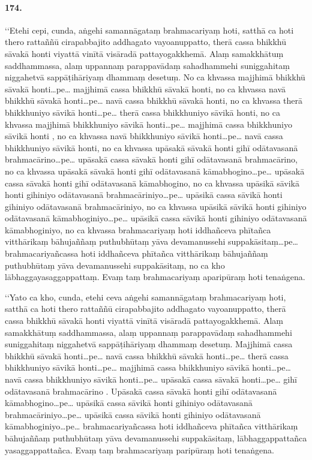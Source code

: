 \paragraph{174.} ‘‘Etehi cepi, cunda, aṅgehi samannāgataṃ brahmacariyaṃ hoti, satthā ca hoti thero rattaññū cirapabbajito addhagato vayoanuppatto, therā cassa bhikkhū sāvakā honti viyattā vinītā visāradā pattayogakkhemā. Alaṃ samakkhātuṃ saddhammassa, alaṃ uppannaṃ parappavādaṃ sahadhammehi suniggahitaṃ niggahetvā sappāṭihāriyaṃ dhammaṃ desetuṃ. No ca khvassa majjhimā bhikkhū sāvakā honti…pe… majjhimā cassa bhikkhū sāvakā honti, no ca khvassa navā bhikkhū sāvakā honti…pe… navā cassa bhikkhū sāvakā honti, no ca khvassa therā bhikkhuniyo sāvikā honti…pe… therā cassa bhikkhuniyo sāvikā honti, no ca khvassa majjhimā bhikkhuniyo sāvikā honti…pe… majjhimā cassa bhikkhuniyo sāvikā honti , no ca khvassa navā bhikkhuniyo sāvikā honti…pe… navā cassa bhikkhuniyo sāvikā honti, no ca khvassa upāsakā sāvakā honti gihī odātavasanā brahmacārino…pe… upāsakā cassa sāvakā honti gihī odātavasanā brahmacārino, no ca khvassa upāsakā sāvakā honti gihī odātavasanā kāmabhogino…pe… upāsakā cassa sāvakā honti gihī odātavasanā kāmabhogino, no ca khvassa upāsikā sāvikā honti gihiniyo odātavasanā brahmacāriniyo…pe… upāsikā cassa sāvikā honti gihiniyo odātavasanā brahmacāriniyo, no ca khvassa upāsikā sāvikā honti gihiniyo odātavasanā kāmabhoginiyo…pe… upāsikā cassa sāvikā honti gihiniyo odātavasanā kāmabhoginiyo, no ca khvassa brahmacariyaṃ hoti iddhañceva phītañca vitthārikaṃ bāhujaññaṃ puthubhūtaṃ yāva devamanussehi suppakāsitaṃ…pe… brahmacariyañcassa hoti iddhañceva phītañca vitthārikaṃ bāhujaññaṃ puthubhūtaṃ yāva devamanussehi suppakāsitaṃ, no ca kho lābhaggayasaggappattaṃ. Evaṃ taṃ brahmacariyaṃ aparipūraṃ hoti tenaṅgena.

‘‘Yato ca kho, cunda, etehi ceva aṅgehi samannāgataṃ brahmacariyaṃ hoti, satthā ca hoti thero rattaññū cirapabbajito addhagato vayoanuppatto, therā cassa bhikkhū sāvakā honti viyattā vinītā visāradā pattayogakkhemā. Alaṃ samakkhātuṃ saddhammassa, alaṃ uppannaṃ parappavādaṃ sahadhammehi suniggahitaṃ niggahetvā sappāṭihāriyaṃ dhammaṃ desetuṃ. Majjhimā cassa bhikkhū sāvakā honti…pe… navā cassa bhikkhū sāvakā honti…pe… therā cassa bhikkhuniyo sāvikā honti…pe… majjhimā cassa bhikkhuniyo sāvikā honti…pe… navā cassa bhikkhuniyo sāvikā honti…pe… upāsakā cassa sāvakā honti…pe… gihī odātavasanā brahmacārino . Upāsakā cassa sāvakā honti gihī odātavasanā kāmabhogino…pe… upāsikā cassa sāvikā honti gihiniyo odātavasanā brahmacāriniyo…pe… upāsikā cassa sāvikā honti gihiniyo odātavasanā kāmabhoginiyo…pe… brahmacariyañcassa hoti iddhañceva phītañca vitthārikaṃ bāhujaññaṃ puthubhūtaṃ yāva devamanussehi suppakāsitaṃ, lābhaggappattañca yasaggappattañca. Evaṃ taṃ brahmacariyaṃ paripūraṃ hoti tenaṅgena.

